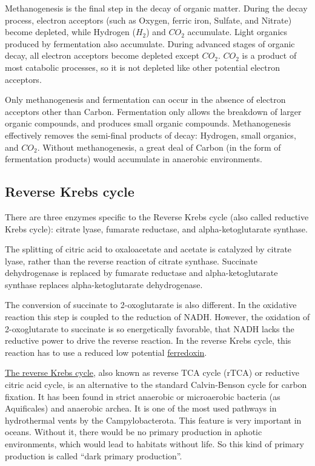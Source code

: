 \documentclass[a4paper,14pt]{extarticle}
\begin{document}
Methanogenesis is the final step in the decay of organic matter. During the decay process,
electron acceptors (such as Oxygen, ferric iron, Sulfate, and Nitrate) become depleted,
while Hydrogen ($H_2$) and $CO_2$ accumulate. Light organics produced by fermentation
also accumulate. During advanced stages of organic decay, all electron acceptors become
depleted except $CO_2$. $CO_2$ is a product of most catabolic processes,
so it is not depleted like other potential electron acceptors.

Only methanogenesis and fermentation can occur in the absence of electron acceptors other
than Carbon. Fermentation only allows the breakdown of larger organic compounds, and
produces small organic compounds. Methanogenesis effectively removes the semi-final
products of decay: Hydrogen, small organics, and $CO_2$. Without methanogenesis, a
great deal of Carbon (in the form of fermentation products) would accumulate in anaerobic
environments.

\subsection{Reverse Krebs cycle}

There are three enzymes specific to the Reverse Krebs cycle (also called reductive Krebs
cycle): citrate lyase, fumarate reductase, and alpha-ketoglutarate synthase.

The splitting of citric acid to oxaloacetate and acetate is catalyzed by citrate lyase,
rather than the reverse reaction of citrate synthase. Succinate dehydrogenase is
replaced by fumarate reductase and alpha-ketoglutarate synthase replaces alpha-ketoglutarate
dehydrogenase.

The conversion of succinate to 2-oxoglutarate is also different. In the oxidative reaction
this step is coupled to the reduction of NADH\@. However, the oxidation of 2-oxoglutarate to
succinate is so energetically favorable, that NADH lacks the reductive power to drive the
reverse reaction. In the reverse Krebs cycle, this reaction has to use a reduced low potential
\href{https://en.wikipedia.org/wiki/Ferredoxin}{ferredoxin}.

\href{https://en.wikipedia.org/wiki/Biological_carbon_fixation}{The reverse Krebs cycle},
also known as reverse TCA cycle (rTCA) or reductive citric acid cycle, is an alternative
to the standard Calvin-Benson cycle for carbon fixation. It has been found in strict
anaerobic or microaerobic bacteria (as Aquificales) and anaerobic archea.  It is one of
the most used pathways in hydrothermal vents by the Campylobacterota. This feature is very
important in oceans. Without it, there would be no primary production in aphotic
environments, which would lead to habitats without life. So this kind of primary
production is called ``dark primary production''.
\end{document}
